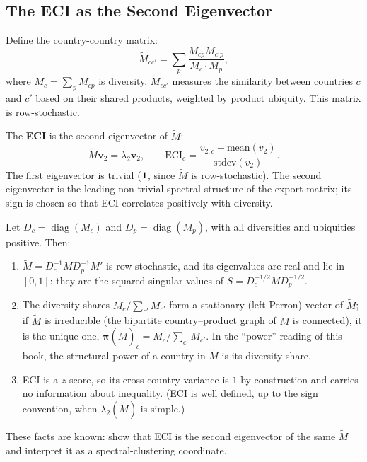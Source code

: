 \documentclass[../structural_economics_book.tex]{subfiles}
\begin{document}
\subsection{The ECI as the Second Eigenvector}

\begin{definition}\label{ch16:def:ECI}
Define the country-country matrix:
\begin{equation}\label{ch16:eq:Mcc}
\tilde{M}_{cc'} = \sum_p \frac{M_{cp}M_{c'p}}{M_c \cdot M_p},
\end{equation}
where $M_c = \sum_p M_{cp}$ is diversity. $\tilde{M}_{cc'}$ measures the similarity between countries $c$ and $c'$ based on their shared products, weighted by product ubiquity. This matrix is row-stochastic.

The \textbf{ECI} is the second eigenvector of $\tilde{M}$:
\begin{equation}\label{ch16:eq:ECI}
\tilde{M}\mathbf{v}_2 = \lambda_2 \mathbf{v}_2, \qquad \text{ECI}_c = \frac{v_{2,c} - \text{mean}(v_2)}{\text{stdev}(v_2)}.
\end{equation}
The first eigenvector is trivial ($\mathbf{1}$, since $\tilde{M}$ is row-stochastic). The second eigenvector is the leading non-trivial spectral structure of the export matrix; its sign is chosen so that ECI correlates positively with diversity.
\end{definition}

\begin{proposition}\label{ch16:thm:ECI_gamma}
Let $D_c = \operatorname{diag}(M_c)$ and $D_p = \operatorname{diag}(M_p)$, with all diversities and ubiquities positive. Then:
\begin{enumerate}
\item $\tilde{M} = D_c^{-1}MD_p^{-1}M'$ is row-stochastic, and its eigenvalues are real and lie in $[0, 1]$: they are the squared singular values of $S = D_c^{-1/2}MD_p^{-1/2}$.
\item The diversity shares $M_c/\sum_{c'}M_{c'}$ form a stationary (left Perron) vector of $\tilde{M}$; if $\tilde{M}$ is irreducible (the bipartite country--product graph of $M$ is connected), it is the unique one, $\boldsymbol{\pi}(\tilde{M})_c = M_c/\sum_{c'}M_{c'}$. In the ``power'' reading of this book, the structural power of a country in $\tilde{M}$ is its diversity share.
\item ECI is a $z$-score, so its cross-country variance is $1$ by construction and carries no information about inequality. (ECI is well defined, up to the sign convention, when $\lambda_2(\tilde{M})$ is simple.)
\end{enumerate}
These facts are known: \citet{mealy2019interpreting} show that ECI is the second eigenvector of the same $\tilde{M}$ and interpret it as a spectral-clustering coordinate.
\end{proposition}
\end{document}
